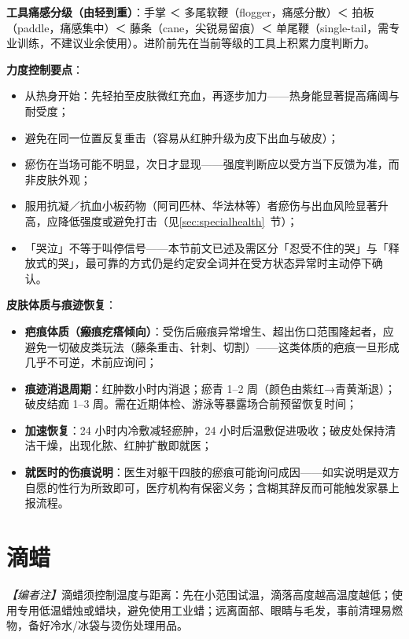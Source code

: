 \documentclass[12pt,UTF8]{ctexbook}
\begin{document}
\noindent\textbf{工具痛感分级（由轻到重）}：手掌 ＜ 多尾软鞭（flogger，痛感分散）＜ 拍板（paddle，痛感集中）＜ 藤条（cane，尖锐易留痕）＜ 单尾鞭（single-tail，需专业训练，不建议业余使用）。进阶前先在当前等级的工具上积累力度判断力。

\noindent\textbf{力度控制要点}：

\begin{itemize}
\item 从热身开始：先轻拍至皮肤微红充血，再逐步加力——热身能显著提高痛阈与耐受度；
\item 避免在同一位置反复重击（容易从红肿升级为皮下出血与破皮）；
\item 瘀伤在当场可能不明显，次日才显现——强度判断应以受方当下反馈为准，而非皮肤外观；
\item 服用抗凝／抗血小板药物（阿司匹林、华法林等）者瘀伤与出血风险显著升高，应降低强度或避免打击（见\ref{sec:specialhealth}~节）；
\item 「哭泣」不等于叫停信号——本节前文已述及需区分「忍受不住的哭」与「释放式的哭」，最可靠的方式仍是约定安全词并在受方状态异常时主动停下确认。
\end{itemize}

\noindent\textbf{皮肤体质与痕迹恢复}：

\begin{itemize}
\item \textbf{疤痕体质（瘢痕疙瘩倾向）}：受伤后瘢痕异常增生、超出伤口范围隆起者，应避免一切破皮类玩法（藤条重击、针刺、切割）——这类体质的疤痕一旦形成几乎不可逆，术前应询问；
\item \textbf{痕迹消退周期}：红肿数小时内消退；瘀青 1--2 周（颜色由紫红→青黄渐退）；破皮结痂 1--3 周。需在近期体检、游泳等暴露场合前预留恢复时间；
\item \textbf{加速恢复}：24 小时内冷敷减轻瘀肿，24 小时后温敷促进吸收；破皮处保持清洁干燥，出现化脓、红肿扩散即就医；
\item \textbf{就医时的伤痕说明}：医生对躯干四肢的瘀痕可能询问成因——如实说明是双方自愿的性行为所致即可，医疗机构有保密义务；含糊其辞反而可能触发家暴上报流程。
\end{itemize}

\section{滴蜡}

\noindent\textit{【编者注】}滴蜡须控制温度与距离：先在小范围试温，滴落高度越高温度越低；使用专用低温蜡烛或蜡块，避免使用工业蜡；远离面部、眼睛与毛发，事前清理易燃物，备好冷水/冰袋与烫伤处理用品。
\end{document}
